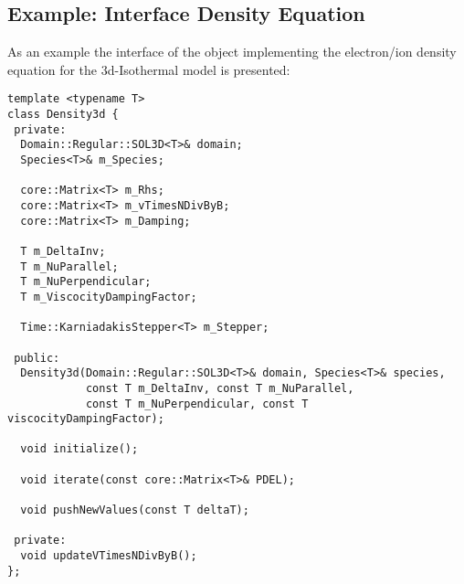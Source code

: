 \documentclass[master.tex]{subfiles}
\begin{document}
\subsection{Example: Interface Density Equation}
As an example the interface of the object implementing the electron/ion density equation for the 3d-Isothermal model is presented:

\begin{lstlisting}
template <typename T>
class Density3d {
 private:
  Domain::Regular::SOL3D<T>& domain;
  Species<T>& m_Species;

  core::Matrix<T> m_Rhs;
  core::Matrix<T> m_vTimesNDivByB;
  core::Matrix<T> m_Damping;

  T m_DeltaInv;
  T m_NuParallel;
  T m_NuPerpendicular;
  T m_ViscocityDampingFactor;

  Time::KarniadakisStepper<T> m_Stepper;

 public:
  Density3d(Domain::Regular::SOL3D<T>& domain, Species<T>& species,
            const T m_DeltaInv, const T m_NuParallel,
            const T m_NuPerpendicular, const T viscocityDampingFactor);

  void initialize();

  void iterate(const core::Matrix<T>& PDEL);

  void pushNewValues(const T deltaT);

 private:
  void updateVTimesNDivByB();
};
\end{lstlisting}
\end{document}
